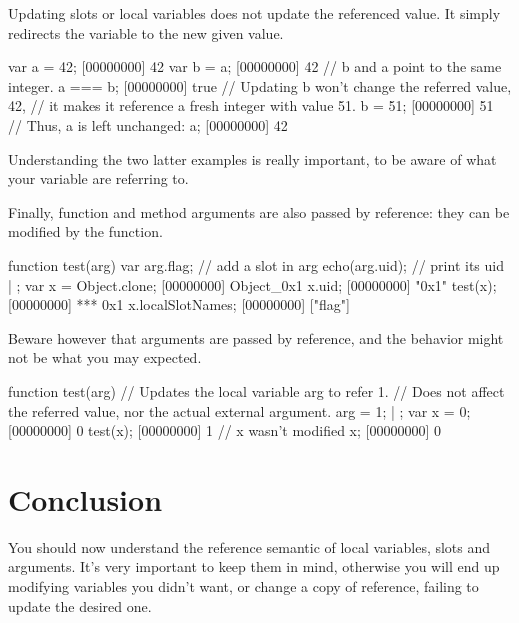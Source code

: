 Updating slots or local variables does not update the referenced
value. It simply redirects the variable to the new given value.

\begin{urbiscript}
var a = 42;
[00000000] 42
var b = a;
[00000000] 42
// b and a point to the same integer.
a === b;
[00000000] true
// Updating b won't change the referred value, 42,
// it makes it reference a fresh integer with value 51.
b = 51;
[00000000] 51
// Thus, a is left unchanged:
a;
[00000000] 42
\end{urbiscript}

Understanding the two latter examples is really important, to be aware
of what your variable are referring to.

Finally, function and method arguments are also passed by reference:
they can be modified by the function.

\begin{urbiscript}
function test(arg)
{
  var arg.flag;  // add a slot in arg
  echo(arg.uid); // print its uid
} | {};
var x = Object.clone;
[00000000] Object_0x1
x.uid;
[00000000] "0x1"
test(x);
[00000000] *** 0x1
x.localSlotNames;
[00000000] ["flag"]
\end{urbiscript}

Beware however that arguments are passed by reference, and the
behavior might not be what you may expected.

\begin{urbiscript}
function test(arg)
{
  // Updates the local variable arg to refer 1.
  // Does not affect the referred value, nor the actual external argument.
  arg = 1;
} | {};
var x = 0;
[00000000] 0
test(x);
[00000000] 1
// x wasn't modified
x;
[00000000] 0
\end{urbiscript}

\section{Conclusion}

You should now understand the reference semantic of local variables,
slots and arguments. It's very important to keep them in mind,
otherwise you will end up modifying variables you didn't want, or
change a copy of reference, failing to update the desired one.

